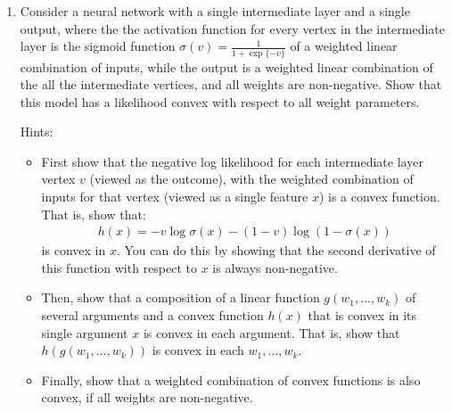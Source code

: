 \documentclass[11pt]{article}
\renewcommand{\vec}[1]{\mathbf{#1}}
\begin{document}
\begin{enumerate}
\begin{answertext}{20cm}{}
\\
If $ \vec{x_{i-1}} = \lambda(\vec{\beta_{0,i-1}} + \vec{B_{i-1}}\vec{x_{0}}) $, $ x_{ij} = \beta_{0} + \frac{1}{\lambda}\vec{\beta^{T}_{i - 1}}\vec{x_{i-1}} $
\begin{align*}
x_{ij} &= \beta_{0,ij} + \frac{1}{\lambda}\vec{\beta^{T}_{ij}}\vec{x_{i-1}} \\
&= \beta_{0,ij} + \frac{1}{\lambda}\vec{\beta^{T}_{ij}}\lambda(\vec{\beta_{0,i-1}} + \vec{B_{i-1}}\vec{x_{0}}) \\
&= (\beta_{0,ij} + \vec{\beta^{T}_{ij}}\vec{\beta_{0,i-1}}) + (\vec{\beta^{T}_{ij}}\vec{B_{i-1}})\vec{x_{0}}
\end{align*}
Which does not change.

\end{answertext} 

\pagebreak

\item Consider a neural network with a single intermediate layer and a single output, where the the activation function for every vertex in the intermediate layer is the sigmoid function $\sigma(v) = \frac{1}{1 + \exp\{ - v \}}$ of a weighted linear combination of inputs, while the output is a weighted linear combination of the all the intermediate vertices, and all weights are non-negative.  Show that this model has a likelihood convex with respect to all weight parameters.

Hints:
\begin{itemize}
\item First show that the negative log likelihood for each intermediate layer vertex $v$ (viewed as the outcome), with the weighted combination of inputs for that vertex (viewed as a single feature $x$) is a convex function.  That is, show that:
{
\begin{align*}
h(x) = - v \log \sigma(x) - (1 - v) \log ( 1 - \sigma(x) )
\end{align*}
}
is convex in $x$.  You can do this by showing that the second derivative of this function with respect to $x$ is always non-negative.
\item Then, show that a composition of a linear function $g(w_1, \ldots, w_k)$ of several arguments and a convex function $h(x)$ that is convex in its single argument $x$ is convex in each argument.  That is, show that $h(g(w_1, \ldots, w_k))$ is convex in each $w_1, \ldots, w_k$.
\item Finally, show that a weighted combination of convex functions is also convex, if all weights are non-negative.
\end{itemize}


\end{enumerate}
\end{document}
